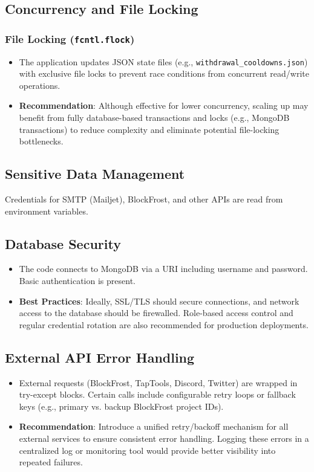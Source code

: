 \documentclass[11pt,a4paper]{article}
\begin{document}
\subsection{Concurrency and File Locking}

\subsubsection{File Locking (\texttt{fcntl.flock})}
\begin{itemize}
    \item The application updates JSON state files (e.g., \texttt{withdrawal\_cooldowns.json}) with exclusive file locks to prevent race conditions from concurrent read/write operations.
    \item \textbf{Recommendation}: Although effective for lower concurrency, scaling up may benefit from fully database-based transactions and locks (e.g., MongoDB transactions) to reduce complexity and eliminate potential file-locking bottlenecks.
\end{itemize}

\subsection{Sensitive Data Management}
Credentials for SMTP (Mailjet), BlockFrost, and other APIs are read from environment variables.

\subsection{Database Security}
\begin{itemize}
    \item The code connects to MongoDB via a URI including username and password. Basic authentication is present.
    \item \textbf{Best Practices}: Ideally, SSL/TLS should secure connections, and network access to the database should be firewalled. Role-based access control and regular credential rotation are also recommended for production deployments.
\end{itemize}

\subsection{External API Error Handling}
\begin{itemize}
    \item External requests (BlockFrost, TapTools, Discord, Twitter) are wrapped in try-except blocks. Certain calls include configurable retry loops or fallback keys (e.g., primary vs. backup BlockFrost project IDs).
    \item \textbf{Recommendation}: Introduce a unified retry/backoff mechanism for all external services to ensure consistent error handling. Logging these errors in a centralized log or monitoring tool would provide better visibility into repeated failures.
\end{itemize}
\end{document}
